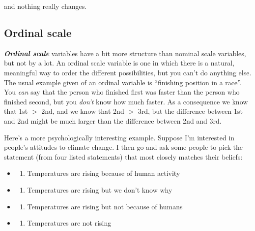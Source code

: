 \documentclass[
]{book}
\providecommand{\tightlist}{%
  \setlength{\itemsep}{0pt}\setlength{\parskip}{0pt}}
\begin{document}
and nothing really changes.

\hypertarget{ordinal-scale}{%
\subsection{Ordinal scale}\label{ordinal-scale}}

\textbf{\emph{Ordinal scale}} variables have a bit more structure than nominal scale variables, but not by a lot. An ordinal scale variable is one in which there is a natural, meaningful way to order the different possibilities, but you can't do anything else. The usual example given of an ordinal variable is ``finishing position in a race''. You \emph{can} say that the person who finished first was faster than the person who finished second, but you \emph{don't} know how much faster. As a consequence we know that 1st \(>\) 2nd, and we know that 2nd \(>\) 3rd, but the difference between 1st and 2nd might be much larger than the difference between 2nd and 3rd.

Here's a more psychologically interesting example. Suppose I'm interested in people's attitudes to climate change. I then go and ask some people to pick the statement (from four listed statements) that most closely matches their beliefs:

\begin{itemize}
\item
  \begin{enumerate}
  \def\labelenumi{(\arabic{enumi})}
  \tightlist
  \item
    Temperatures are rising because of human activity
  \end{enumerate}
\item
  \begin{enumerate}
  \def\labelenumi{(\arabic{enumi})}
  \setcounter{enumi}{1}
  \tightlist
  \item
    Temperatures are rising but we don't know why
  \end{enumerate}
\item
  \begin{enumerate}
  \def\labelenumi{(\arabic{enumi})}
  \setcounter{enumi}{2}
  \tightlist
  \item
    Temperatures are rising but not because of humans
  \end{enumerate}
\item
  \begin{enumerate}
  \def\labelenumi{(\arabic{enumi})}
  \setcounter{enumi}{3}
  \tightlist
  \item
    Temperatures are not rising
  \end{enumerate}
\end{itemize}
\end{document}
